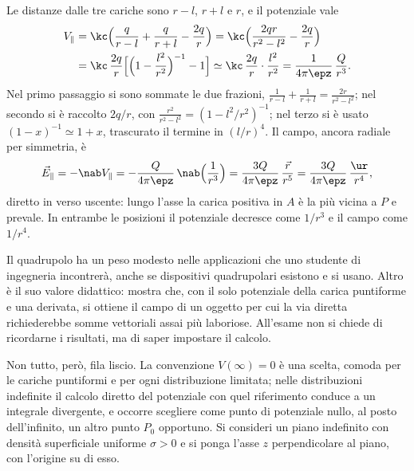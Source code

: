\documentclass[main.tex]{subfiles}
\begin{document}
	Le distanze dalle tre cariche sono $r-l$, $r+l$ e $r$, e il potenziale vale
	\begin{align*}
		V_\parallel&=\kc\Big(\frac{q}{r-l}+\frac{q}{r+l}-\frac{2q}{r}\Big)
		=\kc\Big(\frac{2qr}{r^2-l^2}-\frac{2q}{r}\Big)\\
		&=\kc\,\frac{2q}{r}\Big[\Big(1-\frac{l^2}{r^2}\Big)^{-1}-1\Big]
		\simeq\kc\,\frac{2q}{r}\cdot\frac{l^2}{r^2}=\frac{1}{4\pi\epz}\,\frac{Q}{r^3}.
	\end{align*}
	Nel primo passaggio si sono sommate le due frazioni, $\frac{1}{r-l}+\frac{1}{r+l}=\frac{2r}{r^2-l^2}$; nel secondo si è raccolto $2q/r$, con $\frac{r^2}{r^2-l^2}=(1-l^2/r^2)^{-1}$; nel terzo si è usato $(1-x)^{-1}\simeq1+x$, trascurato il termine in $(l/r)^4$. Il campo, ancora radiale per simmetria, è
	\[
	\vec E_\parallel=-\nab V_\parallel=-\frac{Q}{4\pi\epz}\,\nab\Big(\frac1{r^3}\Big)=\frac{3Q}{4\pi\epz}\,\frac{\vec r}{r^5}=\frac{3Q}{4\pi\epz}\,\frac{\ur}{r^4},
	\]
	diretto in verso uscente: lungo l'asse la carica positiva in $A$ è la più vicina a $P$ e prevale. In entrambe le posizioni il potenziale decresce come $1/r^3$ e il campo come $1/r^4$.
	
	Il quadrupolo ha un peso modesto nelle applicazioni che uno studente di ingegneria incontrerà, anche se dispositivi quadrupolari esistono e si usano. Altro è il suo valore didattico: mostra che, con il solo potenziale della carica puntiforme e una derivata, si ottiene il campo di un oggetto per cui la via diretta richiederebbe somme vettoriali assai più laboriose. All'esame non si chiede di ricordarne i risultati, ma di saper impostare il calcolo.
	
	Non tutto, però, fila liscio. La convenzione $V(\infty)=0$ è una scelta, comoda per le cariche puntiformi e per ogni distribuzione limitata; nelle distribuzioni indefinite il calcolo diretto del potenziale con quel riferimento conduce a un integrale divergente, e occorre scegliere come punto di potenziale nullo, al posto dell'infinito, un altro punto $P_0$ opportuno. Si consideri un piano indefinito con densità superficiale uniforme $\sigma>0$ e si ponga l'asse $z$ perpendicolare al piano, con l'origine su di esso.
	
\end{document}
